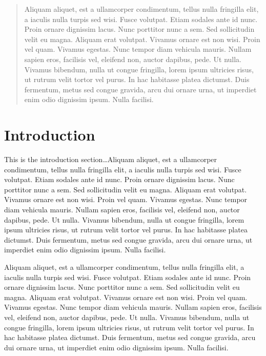 \documentclass[11pt]{article}
\begin{document}
\newpage
\thispagestyle{empty}
\begin{abstract}
\vspace{-0.2in}
Aliquam aliquet, est a ullamcorper condimentum, tellus nulla fringilla elit, a iaculis nulla turpis sed wisi. Fusce volutpat. Etiam sodales ante id nunc. Proin ornare dignissim lacus. Nunc porttitor nunc a sem. Sed sollicitudin velit eu magna. Aliquam erat volutpat. Vivamus ornare est non wisi. Proin vel quam. Vivamus egestas. Nunc tempor diam vehicula mauris. Nullam sapien eros, facilisis vel, eleifend non, auctor dapibus, pede. Ut nulla. Vivamus bibendum, nulla ut congue fringilla, lorem ipsum ultricies risus, ut rutrum velit tortor vel purus. In hac habitasse platea dictumst. Duis fermentum, metus sed congue gravida, arcu dui ornare urna, ut imperdiet enim odio dignissim ipsum. Nulla facilisi. 
\end{abstract} 

\newpage

\setcounter{page}{1} 


\section{Introduction}
\label{sec:intro}
\vspace{-0.2in}
%
This is the introduction section\ldots Aliquam aliquet, est a ullamcorper condimentum, tellus nulla fringilla elit, a iaculis nulla turpis sed wisi. Fusce volutpat. Etiam sodales ante id nunc. Proin ornare dignissim lacus. Nunc porttitor nunc a sem. Sed sollicitudin velit eu magna. Aliquam erat volutpat. Vivamus ornare est non wisi. Proin vel quam. Vivamus egestas. Nunc tempor diam vehicula mauris. Nullam sapien eros, facilisis vel, eleifend non, auctor dapibus, pede. Ut nulla. Vivamus bibendum, nulla ut congue fringilla, lorem ipsum ultricies risus, ut rutrum velit tortor vel purus. In hac habitasse platea dictumst. Duis fermentum, metus sed congue gravida, arcu dui ornare urna, ut imperdiet enim odio dignissim ipsum. Nulla facilisi. 

Aliquam aliquet, est a ullamcorper condimentum, tellus nulla fringilla elit, a iaculis nulla turpis sed wisi. Fusce volutpat. Etiam sodales ante id nunc. Proin ornare dignissim lacus. Nunc porttitor nunc a sem. Sed sollicitudin velit eu magna. Aliquam erat volutpat. Vivamus ornare est non wisi. Proin vel quam. Vivamus egestas. Nunc tempor diam vehicula mauris. Nullam sapien eros, facilisis vel, eleifend non, auctor dapibus, pede. Ut nulla. Vivamus bibendum, nulla ut congue fringilla, lorem ipsum ultricies risus, ut rutrum velit tortor vel purus. In hac habitasse platea dictumst. Duis fermentum, metus sed congue gravida, arcu dui ornare urna, ut imperdiet enim odio dignissim ipsum. Nulla facilisi. 
\end{document}
